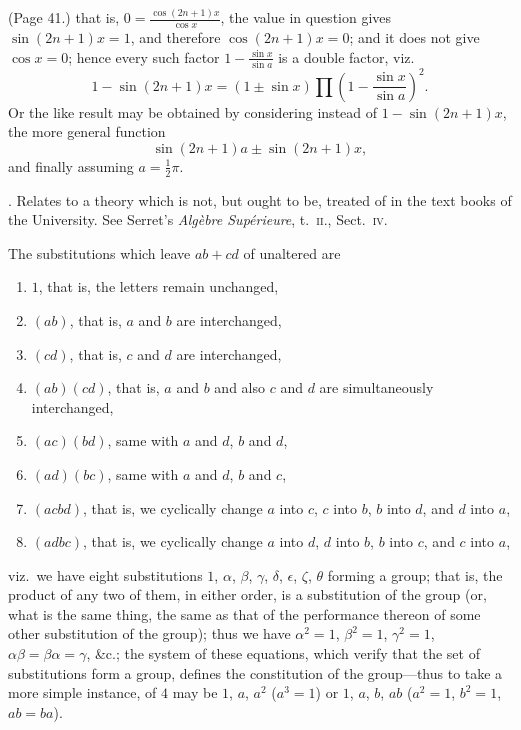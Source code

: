 \documentclass[11pt,a4paper]{article}
\begin{document}
\bigskip

\noindent (Page 41.) that is, $0 = \frac{\cos (2n + 1) x}{\cos x}$, the value in question gives $\sin (2n + 1) x = 1$, and therefore $\cos (2n + 1) x = 0$; and it does not give $\cos x = 0$; hence every such factor $1 - \frac{\sin x}{\sin a}$ is a double factor, viz.\
\[
1 - \sin (2n + 1) x = (1 \pm \sin x) \prod \left(1 - \frac{\sin x}{\sin a}\right)^2.
\]
Or the like result may be obtained by considering instead of $1 - \sin (2n + 1) x$, the more general function
\[
\sin (2n + 1) a \pm \sin (2n + 1) x,
\]
and finally assuming $a = \tfrac{1}{2} \pi$.

\medskip

. Relates to a theory which is not, but ought to be, treated of in the text books of the University. See Serret's \textit{Alg\`ebre Sup\'erieure}, t.\ \textsc{ii}., Sect.\ \textsc{iv}.

The substitutions which leave $ab + cd$ of unaltered are
\begin{enumerate}[label=\arabic*]
\item[$1$] $1$, that is, the letters remain unchanged,
\item[$a$] $(ab)$, that is, $a$ and $b$ are interchanged,
\item[$\beta$] $(cd)$, that is, $c$ and $d$ are interchanged,
\item[$\gamma$] $(ab)(cd)$, that is, $a$ and $b$ and also $c$ and $d$ are simultaneously interchanged,
\item[$\delta$] $(ac)(bd)$, same with $a$ and $d$, $b$ and $d$,
\item[$\epsilon$] $(ad)(bc)$, same with $a$ and $d$, $b$ and $c$,
\item[$\zeta$] $(acbd)$, that is, we cyclically change $a$ into $c$, $c$ into $b$, $b$ into $d$, and $d$ into $a$,
\item[$\theta$] $(adbc)$, that is, we cyclically change $a$ into $d$, $d$ into $b$, $b$ into $c$, and $c$ into $a$,
\end{enumerate}

viz.\ we have eight substitutions $1$, $\alpha$, $\beta$, $\gamma$, $\delta$, $\epsilon$, $\zeta$, $\theta$ forming a group; that is, the product of any two of them, in either order, is a substitution of the group (or, what is the same thing, the same as that of the performance thereon of some other substitution of the group); thus we have $\alpha^2 = 1$, $\beta^2 = 1$, $\gamma^2 = 1$, $\alpha\beta = \beta\alpha = \gamma$, \&c.; the system of these equations, which verify that the set of substitutions form a group, defines the constitution of the group---thus to take a more simple instance, of $4$ may be $1$, $a$, $a^2$ ($a^3 = 1$) or $1$, $a$, $b$, $ab$ ($a^2 = 1$, $b^2 = 1$, $ab = ba$).
\end{document}
